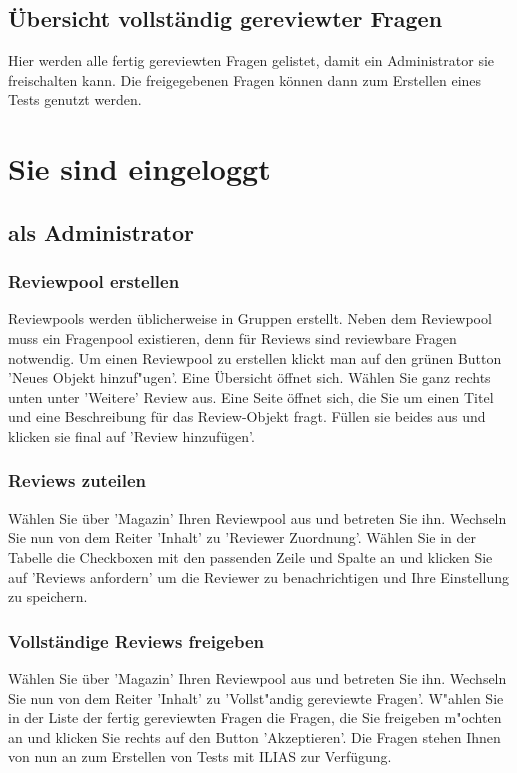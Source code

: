 \documentclass[12pt,a4paper]{scrreprt}
\begin{document}
\section{Übersicht vollständig gereviewter Fragen}
Hier werden alle fertig gereviewten Fragen gelistet, damit ein Administrator sie freischalten kann. Die freigegebenen Fragen können dann zum Erstellen eines Tests genutzt werden.


\chapter{Sie sind eingeloggt}
	\section{als Administrator}
		\subsection{Reviewpool erstellen}
		Reviewpools werden üblicherweise in Gruppen erstellt. Neben dem Reviewpool muss ein Fragenpool existieren, denn für Reviews sind reviewbare Fragen notwendig. Um einen Reviewpool zu erstellen klickt man auf den grünen Button 'Neues Objekt hinzuf"ugen'. Eine Übersicht öffnet sich. Wählen Sie ganz rechts unten unter 'Weitere' Review aus. Eine Seite öffnet sich, die Sie um einen Titel und eine Beschreibung für das Review-Objekt fragt. Füllen sie beides aus und klicken sie final auf 'Review hinzufügen'.
		\subsection{Reviews zuteilen}
		Wählen Sie über 'Magazin' Ihren Reviewpool aus und betreten Sie ihn. Wechseln Sie nun von dem Reiter 'Inhalt' zu 'Reviewer Zuordnung'. Wählen Sie in der Tabelle die Checkboxen mit den passenden Zeile und Spalte an und klicken Sie auf 'Reviews anfordern' um die Reviewer zu benachrichtigen und Ihre Einstellung zu speichern.
		\subsection{Vollständige Reviews freigeben}
		Wählen Sie über 'Magazin' Ihren Reviewpool aus und betreten Sie ihn. Wechseln Sie nun von dem Reiter 'Inhalt' zu 'Vollst"andig gereviewte Fragen'. W"ahlen Sie in der Liste der fertig gereviewten Fragen die Fragen, die Sie freigeben m"ochten an und klicken Sie rechts auf den Button 'Akzeptieren'. Die Fragen stehen Ihnen von nun an zum Erstellen von Tests mit ILIAS zur Verfügung.
\end{document}
